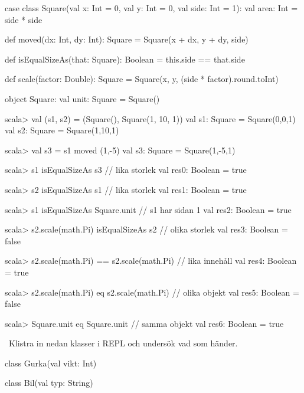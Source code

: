 \SOLUTION

\TaskSolved \what

\SubtaskSolved

\begin{Code}
case class Square(val x: Int = 0, val y: Int = 0, val side: Int = 1):
  val area: Int = side * side

  def moved(dx: Int, dy: Int): Square = Square(x + dx, y + dy, side)

  def isEqualSizeAs(that: Square): Boolean = this.side == that.side

  def scale(factor: Double): Square =
    Square(x, y, (side * factor).round.toInt)

object Square:
  val unit: Square = Square()
\end{Code}

\SubtaskSolved
\begin{REPL}
scala> val (s1, s2) = (Square(), Square(1, 10, 1))
val s1: Square = Square(0,0,1)
val s2: Square = Square(1,10,1)

scala> val s3 = s1 moved (1,-5)
val s3: Square = Square(1,-5,1)

scala> s1 isEqualSizeAs s3       // lika storlek
val res0: Boolean = true

scala> s2 isEqualSizeAs s1       // lika storlek
val res1: Boolean = true

scala> s1 isEqualSizeAs Square.unit   // s1 har sidan 1
val res2: Boolean = true

scala> s2.scale(math.Pi) isEqualSizeAs s2  // olika storlek
val res3: Boolean = false

scala> s2.scale(math.Pi) == s2.scale(math.Pi) // lika innehåll
val res4: Boolean = true

scala> s2.scale(math.Pi) eq s2.scale(math.Pi)  // olika objekt
val res5: Boolean = false

scala> Square.unit eq Square.unit   // samma objekt
val res6: Boolean = true
\end{REPL}

\QUESTEND




\clearpage

\AdvancedTasks %


\QUESTBEGIN

\Task \what~Klistra in nedan klasser i REPL och undersök vad som händer.

\begin{Code}
class Gurka(val vikt: Int)

class Bil(val typ: String)
\end{Code}

